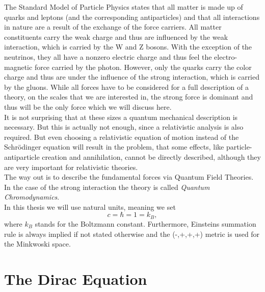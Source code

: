 The Standard Model of Particle Physics states that all matter is made up of quarks and leptons (and the corresponding antiparticles) and that all interactions in nature are a result of the exchange of the force carriers. All matter constituents carry the weak charge and thus are influenced by the weak interaction, which is carried by the W and Z bosons. With the exception of the neutrinos, they all have a nonzero electric charge and thus feel the electro-magnetic force carried by the photon. However, only the quarks carry the color charge and thus are under the influence of the strong interaction, which is carried by the gluons.
While all forces have to be considered for a full description of a theory, on the scales that we are interested in, the strong force is dominant and thus will be the only force which we will discuss here.\\
It is not surprising that at these sizes a quantum mechanical description is necessary. But this is actually not enough, since a relativistic analysis is also required. But even choosing a relativistic equation of motion instead of the Schrödinger equation will result in the problem, that some effects, like particle-antiparticle creation and annihilation, cannot be directly described, although they are very important for relativistic theories.\\
The way out is to describe the fundamental forces via Quantum Field Theories. In the case of the strong interaction the theory is called \textit{Quantum Chromodynamics}.\cite{thomson}\\
In this thesis we will use natural units, meaning we set
\begin{equation}
    c=\hbar=1=k_B,
\end{equation}
where $k_B$ stands for the Boltzmann constant. Furthermore, Einsteins summation rule is always implied if not stated otherwise and the (-,+,+,+) metric is used for the Minkwoski space.



\section{The Dirac Equation}


